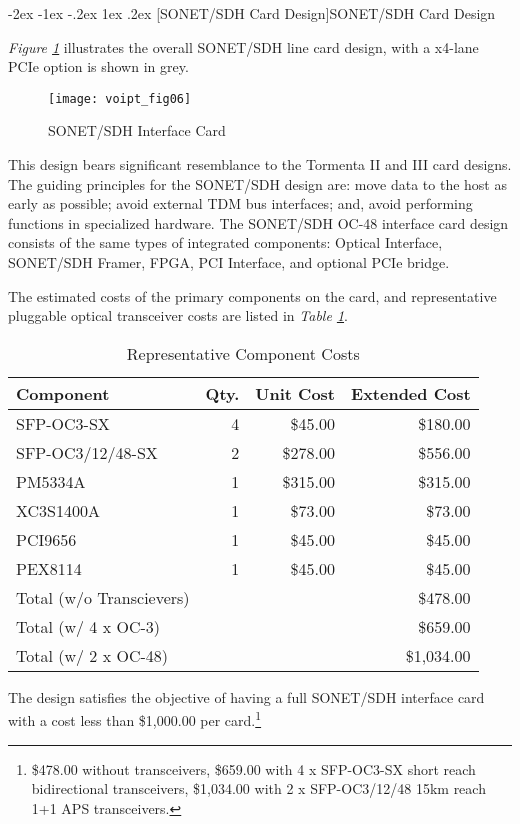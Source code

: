 \documentclass[letterpaper,final,notitlepage,twocolumn,10pt,twoside]{article}
\makeatletter
\let\large = \normalsize
\let\normalsize = \small
\let\small = \footnotesize
\let\footnotesize = \scriptsize
\let\scriptsize = \tiny
\renewcommand\section{\@startsection {section}{1}{\z@}%
                                   {-2ex \@plus -1ex \@minus -.2ex}%
                                   {1ex \@plus .2ex}%
                                   {\normalfont\large\bfseries}}
\makeatother
\begin{document}
\section[SONET/SDH Card Design]{SONET/SDH Card Design}

\textsl{Figure \ref{figure:voipt_fig06}} illustrates the overall SONET/SDH line
card design, with a x4-lane PCIe option is shown in grey.
\begin{figure}[htp]
\center\texttt{[image: voipt\_fig06]}
\caption[OC48card]{SONET/SDH Interface Card}
\label{figure:voipt_fig06}
\end{figure}
This design bears significant resemblance to the Tormenta II and III card
designs.  The guiding principles for the SONET/SDH design are: move data to the
host as early as possible; avoid external TDM bus interfaces; and, avoid
performing functions in specialized hardware.  The SONET/SDH OC-48 interface
card design consists of the same types of integrated components: Optical
Interface, SONET/SDH Framer, FPGA, PCI Interface, and optional PCIe bridge.

The estimated costs of the primary components on the card, and representative
pluggable optical transceiver costs are listed in \textsl{Table
\ref{table:components}}.
\begin{table}[htp]
\footnotesize
\begin{center}
\setlength{\tabcolsep}{0.3em}
\setlength{\arraycolsep}{0.3em}
\begin{tabular}{lrrr}\\
Component & Qty. & Unit Cost & Extended Cost\\
\hline
SFP-OC3-SX & 4 & \$45.00 & \$180.00\\
SFP-OC3/12/48-SX & 2 & \$278.00 & \$556.00\\
\hline
PM5334A & 1 & \$315.00 & \$315.00\\
XC3S1400A & 1 & \$73.00 & \$73.00\\
PCI9656 & 1 & \$45.00 & \$45.00\\
PEX8114 & 1 & \$45.00 & \$45.00\\
\hline
Total (w/o Transcievers) & & & \$478.00\\
Total (w/ 4 x OC-3) & & & \$659.00\\
Total (w/ 2 x OC-48) & & & \$1,034.00\\
\hline
\end{tabular}
\caption{Representative Component Costs}
\label{table:components}
\end{center}
\normalsize
\end{table}
The design satisfies the objective of having a full SONET/SDH interface card
with a cost less than \$1,000.00 per card.\footnote{\$478.00 without
transceivers, \$659.00 with 4 x SFP-OC3-SX short reach bidirectional
transceivers, \$1,034.00 with 2 x SFP-OC3/12/48 15km reach 1+1 APS
transceivers.}
\end{document}
